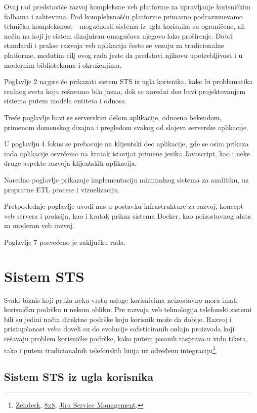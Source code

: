 \documentclass[12pt,oneside]{memoir}
\begin{document}
Ovaj rad predstaviće razvoj kompleksne veb platforme za upravljanje korisničkim žalbama i zahtevima. Pod kompleksnošću platforme primarno podrazumevamo tehničku kompleksnost - mogućnosti sistema iz ugla korisnika su ograničene, ali način na koji je sistem dizajniran omogućava njegovo lako proširenje. Dobri standardi i prakse razvoja veb aplikacija često se vezuju za tradicionalne platforme, međutim cilj ovog rada jeste da predstavi njihovu upotrebljivost i u modernim bibliotekama i okruženjima.

Poglavlje 2 najpre će prikazati sistem STS iz ugla korisnika, kako bi problematika realnog sveta koju rešavamo bila jasna, dok se naredni deo bavi projektovanjem sistema putem modela entiteta i odnosa. 

Treće poglavlje bavi se serverskim delom aplikacije, odnosno bekendom, primenom domenskog dizajna i pregledom svakog od slojeva serverske aplikacije.

U poglavlju 4 fokus se prebacuje na klijentski deo aplikacije, gde se osim prikaza rada aplikacije osvrćemo na kratak istorijat primene jezika Javascript, kao i neke druge aspekte razvoja klijentskih aplikacija.

Naredno poglavlje prikazuje implementaciju minimalnog sistema za analitiku, uz propratne ETL procese i vizuelizaciju.

Pretposlednje poglavlje uvodi nas u postavku infrastrukture za razvoj, koncept veb servera i proksija, kao i kratak prikaz sistema Docker, kao neizostavnog alata za moderan veb razvoj.

Poglavlje 7 posvećeno je zaključku rada.

\chapter{Sistem STS}
Svaki biznis koji pruža neku vrstu usluge korisnicima neizostavno mora imati korisničku podršku u nekom obliku. Pre razvoja veb tehnologija telefonski sistemi bili su jedini način direktne podrške koju korisnik može da dobije. Razvoj i pristupčanost veba doveli su do evolucije sofisticiranih onlajn proizvoda koji rešavaju problem korisničke podrške, kako putem pisanih rasprava u vidu tiketa, tako i putem tradicionalnih telefonskih linija uz određenu integraciju\footnote{\href{http://zendesk.com}{Zendesk}, \href{https://www.8x8.com/}{8x8}, \href{https://www.atlassian.com/software/jira/service-management}{Jira Service Management}.}.

\section{Sistem STS iz ugla korisnika}
\end{document}
